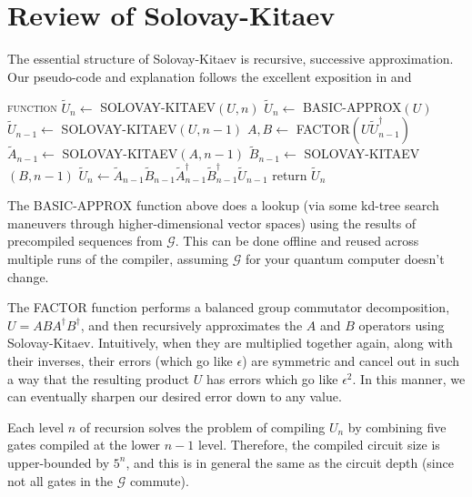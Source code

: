 \section{Review of Solovay-Kitaev}
\label{sec:sk-algo}

The essential structure of Solovay-Kitaev is recursive, successive
approximation. Our pseudo-code and explanation
follows the excellent exposition in \cite{Dawson2005} and \cite{harrow01}

\begin{algorithmic}[1]
\STATE \textsc{function} $\tilde{U}_n \leftarrow$ SOLOVAY-KITAEV$(U,n)$
\STATE $\tilde{U}_n \leftarrow $ BASIC-APPROX$(U)$
\ELSE
\STATE $\tilde{U}_{n-1} \leftarrow$ SOLOVAY-KITAEV$(U, n-1)$
\STATE $A,B \leftarrow $ FACTOR$(U\tilde{U}^\dagger_{n-1})$
\STATE $\tilde{A}_{n-1} \leftarrow $ SOLOVAY-KITAEV$(A, n-1)$
\STATE $\tilde{B}_{n-1} \leftarrow $ SOLOVAY-KITAEV$(B, n-1)$
\STATE $\tilde{U}_n \leftarrow \tilde{A}_{n-1}\tilde{B}_{n-1}\tilde{A}^\dagger_{n-1}\tilde{B}^\dagger_{n-1}\tilde{U}_{n-1}$
\ENDIF
return $\tilde{U}_n$
\end{algorithmic}

The BASIC-APPROX function above does a lookup (via some kd-tree search
maneuvers through higher-dimensional vector spaces) using the results of
precompiled sequences from $\mathcal{G}$.
This can be
done offline and reused across multiple runs of the compiler, assuming
$\mathcal{G}$ for your quantum computer doesn't change.

The FACTOR function performs a balanced group commutator decomposition,
$U = ABA^\dagger B^\dagger$, and then recursively approximates the $A$ and $B$
operators using Solovay-Kitaev. Intuitively, when they are multiplied
together again, along with their inverses, their errors (which go like
$\epsilon$) are symmetric and cancel out in such a way that the resulting
product $U$ has errors which go like $\epsilon^2$. In this manner, we can
eventually sharpen our desired error down to any value.

Each level $n$ of recursion solves the problem of compiling 
$U_n$ by combining five gates compiled at the lower $n-1$ level.
Therefore, the compiled circuit size is upper-bounded by $5^n$, and
this is in general the same as the circuit depth (since not all gates in the
$\mathcal{G}$ commute).
